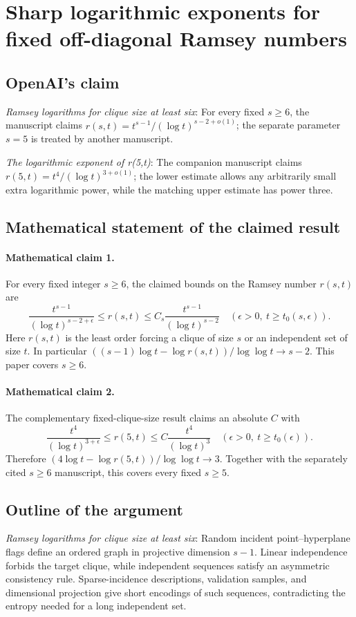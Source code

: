 \documentclass[11pt]{article}
\begin{document}
\section*{Sharp logarithmic exponents for fixed off-diagonal Ramsey numbers}

\subsection{OpenAI's claim}
\textit{Ramsey logarithms for clique size at least six}: For every fixed $s\ge6$, the manuscript claims $r(s,t)=t^{s-1}/(\log t)^{s-2+o(1)}$; the separate parameter $s=5$ is treated by another manuscript.

\textit{The logarithmic exponent of r(5,t)}: The companion manuscript claims $r(5,t)=t^4/(\log t)^{3+o(1)}$; the lower estimate allows any arbitrarily small extra logarithmic power, while the matching upper estimate has power three.

\subsection{Mathematical statement of the claimed result}
\paragraph{Mathematical claim 1.} For every fixed integer $s\ge6$, the claimed bounds on the Ramsey number $r(s,t)$ are \[\frac{t^{s-1}}{(\log t)^{s-2+\epsilon}}\le r(s,t)\le C_s\frac{t^{s-1}}{(\log t)^{s-2}}\quad(\epsilon>0,\ t\ge t_0(s,\epsilon)).\] Here $r(s,t)$ is the least order forcing a clique of size $s$ or an independent set of size $t$. In particular $((s-1)\log t-\log r(s,t))/\log\log t\to s-2$. This paper covers $s\ge6$.

\paragraph{Mathematical claim 2.} The complementary fixed-clique-size result claims an absolute $C$ with \[\frac{t^4}{(\log t)^{3+\epsilon}}\le r(5,t)\le C\frac{t^4}{(\log t)^3}\quad(\epsilon>0,\ t\ge t_0(\epsilon)).\] Therefore $(4\log t-\log r(5,t))/\log\log t\to3$. Together with the separately cited $s\ge6$ manuscript, this covers every fixed $s\ge5$.

\subsection{Outline of the argument}
\textit{Ramsey logarithms for clique size at least six}: Random incident point--hyperplane flags define an ordered graph in projective dimension $s-1$. Linear independence forbids the target clique, while independent sequences satisfy an asymmetric consistency rule. Sparse-incidence descriptions, validation samples, and dimensional projection give short encodings of such sequences, contradicting the entropy needed for a long independent set.
\end{document}
